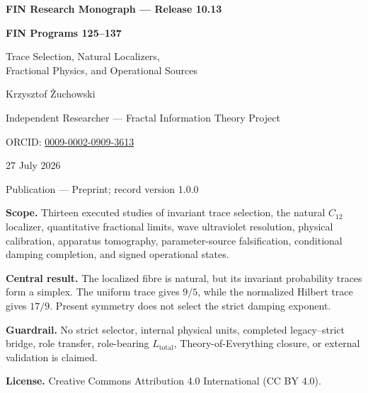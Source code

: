 \documentclass[11pt,a4paper,openany]{report}
\begin{document}
\hypersetup{pageanchor=false}
\begin{titlepage}
\centering
\vspace*{9mm}
{\Large\bfseries FIN Research Monograph --- Release 10.13\par}
\vspace{11mm}
{\Huge\bfseries FIN Programs 125--137\par}
\vspace{6mm}
{\Large Trace Selection, Natural Localizers,\\
Fractional Physics, and Operational Sources\par}
\vspace{17mm}
{\Large Krzysztof \.Zuchowski\par}
\vspace{2mm}
{\normalsize Independent Researcher --- Fractal Information Theory Project\par}
\vspace{2mm}
{\normalsize ORCID: \href{https://orcid.org/0009-0002-0909-3613}{0009-0002-0909-3613}\par}
\vspace{10mm}
{\large 27 July 2026\par}
{\normalsize Publication --- Preprint; record version 1.0.0\par}
\vfill
\begin{minipage}{0.88\textwidth}
\small
\textbf{Scope.} Thirteen executed studies of invariant trace selection,
the natural \(C_{12}\) localizer, quantitative fractional limits,
wave ultraviolet resolution, physical calibration, apparatus tomography,
parameter-source falsification, conditional damping completion, and signed
operational states.

\medskip
\textbf{Central result.} The localized fibre is natural, but its invariant
probability traces form a simplex. The uniform trace gives \(9/5\), while the
normalized Hilbert trace gives \(17/9\). Present symmetry does not select the
strict damping exponent.

\medskip
\textbf{Guardrail.} No strict selector, internal physical units, completed
legacy--strict bridge, role transfer, role-bearing \(L_{\mathrm{total}}\),
Theory-of-Everything closure, or external validation is claimed.

\medskip
\textbf{License.} Creative Commons Attribution 4.0 International (CC BY 4.0).
\end{minipage}
\vfill
\end{titlepage}
\hypersetup{pageanchor=true}
\end{document}
